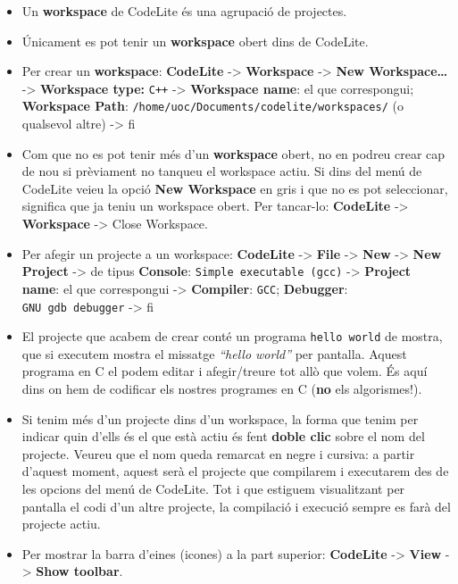 \documentclass[]{book}
\providecommand{\tightlist}{%
  \setlength{\itemsep}{0pt}\setlength{\parskip}{0pt}}
\begin{document}
\begin{itemize}
\tightlist
\item
  Un \textbf{workspace} de CodeLite és una agrupació de projectes.
\item
  Únicament es pot tenir un \textbf{workspace} obert dins de CodeLite.
\item
  Per crear un \textbf{workspace}: \textbf{CodeLite} -\textgreater{} \textbf{Workspace} -\textgreater{} \textbf{New Workspace\ldots{}} -\textgreater{} \textbf{Workspace type:} \texttt{C++} -\textgreater{} \textbf{Workspace name}: el que correspongui; \textbf{Workspace Path}: \texttt{/home/uoc/Documents/codelite/workspaces/} (o qualsevol altre) -\textgreater{} fi
\item
  Com que no es pot tenir més d'un \textbf{workspace} obert, no en podreu crear cap de nou si prèviament no tanqueu el workspace actiu. Si dins del menú de CodeLite veieu la opció \textbf{New Workspace} en gris i que no es pot seleccionar, significa que ja teniu un workspace obert. Per tancar-lo: \textbf{CodeLite} -\textgreater{} \textbf{Workspace} -\textgreater{} Close Workspace.
\item
  Per afegir un projecte a un workspace: \textbf{CodeLite} -\textgreater{} \textbf{File} -\textgreater{} \textbf{New} -\textgreater{} \textbf{New Project} -\textgreater{} de tipus \textbf{Console}: \texttt{Simple\ executable\ (gcc)} -\textgreater{} \textbf{Project name}: el que correspongui -\textgreater{} \textbf{Compiler}: \texttt{GCC}; \textbf{Debugger}: \texttt{GNU\ gdb\ debugger} -\textgreater{} fi
\item
  El projecte que acabem de crear conté un programa \texttt{hello\ world} de mostra, que si executem mostra el missatge \emph{``hello world''} per pantalla. Aquest programa en C el podem editar i afegir/treure tot allò que volem. És aquí dins on hem de codificar els nostres programes en C (\textbf{no} els algorismes!).
\item
  Si tenim més d'un projecte dins d'un workspace, la forma que tenim per indicar quin d'ells és el que està actiu és fent \textbf{doble clic} sobre el nom del projecte. Veureu que el nom queda remarcat en negre i cursiva: a partir d'aquest moment, aquest serà el projecte que compilarem i executarem des de les opcions del menú de CodeLite. Tot i que estiguem visualitzant per pantalla el codi d'un altre projecte, la compilació i execució sempre es farà del projecte actiu.
\item
  Per mostrar la barra d'eines (icones) a la part superior: \textbf{CodeLite} -\textgreater{} \textbf{View} -\textgreater{} \textbf{Show toolbar}.

\end{itemize}
\end{document}
